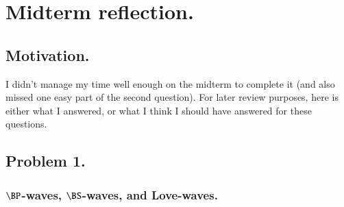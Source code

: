 %
%

\chapter{Midterm reflection.}
\label{chap:continuumMidtermReflection}
{}
\date{Mar 14, 2012}

\beginArtWithToc

\section{Motivation.}

I didn't manage my time well enough on the midterm to complete it (and also missed one easy part of the second question).  For later review purposes, here is either what I answered, or what I think I should have answered for these questions.

\section{Problem 1.}

\subsection{$\BP$-waves, $\BS$-waves, and Love-waves.}

